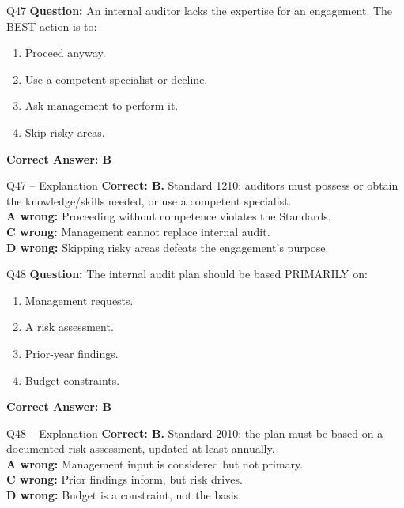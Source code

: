 \documentclass[aspectratio=169,10pt]{beamer}
\begin{document}
	\begin{frame}[t]{Q47}
		\small
		\textbf{Question:} An internal auditor lacks the expertise for an engagement. The BEST action is to:
		\begin{enumerate}[label=\Alph*.,itemsep=1pt,topsep=2pt]
			\item Proceed anyway.
			\item Use a competent specialist or decline.
			\item Ask management to perform it.
			\item Skip risky areas.
		\end{enumerate}
		\vspace{4pt}
		\textbf{Correct Answer: B}
	\end{frame}
	
	\begin{frame}[t]{Q47 -- Explanation}
		\small
		\textbf{Correct: B.} Standard 1210: auditors must possess or obtain the knowledge/skills needed, or use a competent specialist. \\[4pt]
		\textbf{A wrong:} Proceeding without competence violates the Standards. \\[2pt]
		\textbf{C wrong:} Management cannot replace internal audit. \\[2pt]
		\textbf{D wrong:} Skipping risky areas defeats the engagement's purpose.
	\end{frame}
	
	\begin{frame}[t]{Q48}
		\small
		\textbf{Question:} The internal audit plan should be based PRIMARILY on:
		\begin{enumerate}[label=\Alph*.,itemsep=1pt,topsep=2pt]
			\item Management requests.
			\item A risk assessment.
			\item Prior-year findings.
			\item Budget constraints.
		\end{enumerate}
		\vspace{4pt}
		\textbf{Correct Answer: B}
	\end{frame}
	
	\begin{frame}[t]{Q48 -- Explanation}
		\small
		\textbf{Correct: B.} Standard 2010: the plan must be based on a documented risk assessment, updated at least annually. \\[4pt]
		\textbf{A wrong:} Management input is considered but not primary. \\[2pt]
		\textbf{C wrong:} Prior findings inform, but risk drives. \\[2pt]
		\textbf{D wrong:} Budget is a constraint, not the basis.
	\end{frame}
	
\end{document}
